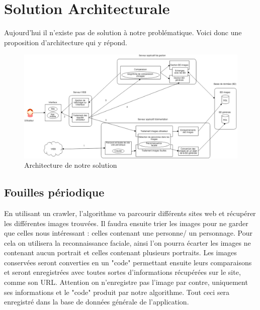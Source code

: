 \documentclass[a4paper,12pt]{article}
\begin{document}
\section{Solution Architecturale}
Aujourd'hui il n'existe pas de solution à notre problématique. Voici donc une proposition d'architecture qui y répond. 

\begin{figure}[!ht]
    \centering
        \includegraphics[scale=0.4, angle=-90]{images/SchemaArchitecture.png}
        \caption{Architecture de notre solution}
    \end{figure}

    
 \subsection{Fouilles périodique} 
 En utilisant un crawler, l'algorithme va parcourir différents sites web et récupérer les différentes images trouvées. Il faudra ensuite trier les images pour ne garder que celles nous intéressant : celles contenant une personne/ un personnage. Pour cela on utilisera la reconnaissance faciale, ainsi l'on pourra écarter les images ne contenant aucun portrait et celles contenant plusieurs portraits. Les images conservées seront converties en un "code" permettant ensuite leurs comparaisons et seront enregistrées avec toutes sortes d'informations récupérées sur le site, comme son URL. Attention on n'enregistre pas l'image par contre, uniquement ses informations et le "code" produit par notre algorithme. Tout ceci sera enregistré dans la base de données générale de l'application. 
\end{document}
